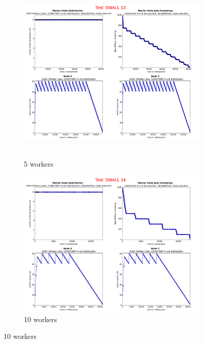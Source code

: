 \documentclass{article}
\begin{document}



\begin{figure}[p] 
  \begin{subfigure}[b]{0.5\linewidth}
    \centering
    \hbox{\hspace{-5.0em} \includegraphics[width=1.2\linewidth]{combined_small_growing_workers_constant/case_small_13} }
    \caption{5 workers}
    \label{testConstantSmall5} 
    \vspace{4ex}
  \end{subfigure}%
  \begin{subfigure}[b]{0.5\linewidth}
    \centering
    \includegraphics[width=1.2\linewidth]{combined_small_growing_workers_constant/case_small_14} 
    \caption{10 workers} 
    \label{testConstantSmall10} 
    \vspace{4ex}
  \end{subfigure} 
  

\end{figure}
\end{document}
